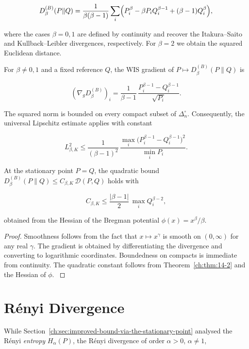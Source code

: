 \[
D_\beta^{(B)}(P\|Q)
=
\frac{1}{\beta(\beta-1)}
\sum_i
\Bigl(
P_i^\beta
-
\beta P_i Q_i^{\beta-1}
+
(\beta-1)Q_i^\beta
\Bigr),
\]

where the cases \(\beta=0,1\) are defined by continuity and recover the
Itakura--Saito and Kullback--Leibler divergences, respectively.  For
\(\beta=2\) we obtain the squared Euclidean distance.

\begin{theorem}
\label{ch:thm:beta-div}
For \(\beta\neq0,1\) and a fixed reference \(Q\), the WIS gradient of
\(P\mapsto D_\beta^{(B)}(P\|Q)\) is

\[
(\nabla_g D_\beta^{(B)})_i
=
\frac{1}{\beta-1}
\,
\frac{
P_i^{\beta-1} - Q_i^{\beta-1}
}{
\sqrt{P_i}
}.
\]

The squared norm is bounded on every compact subset of
\(\Delta_n^\circ\).  Consequently, the universal Lipschitz estimate
applies with constant

\[
L_{\beta,K}^2
\le
\frac{1}{(\beta-1)^2}
\,
\frac{
\max_i\bigl(P_i^{\beta-1}-Q_i^{\beta-1}\bigr)^2
}{
\min_i P_i
}.
\]

At the stationary point \(P=Q\), the quadratic bound
\(D_\beta^{(B)}(P\|Q)\le C_{\beta,K}\,\mathcal D(P,Q)\) holds with

\[
C_{\beta,K}
\le
\frac{|\beta-1|}{2}
\,
\max_i Q_i^{\beta-2},
\]

obtained from the Hessian of the Bregman potential \(\phi(x)=x^\beta/\beta\).
\end{theorem}

\begin{proof}
Smoothness follows from the fact that \(x\mapsto x^\gamma\) is smooth on
\((0,\infty)\) for any real \(\gamma\).  The gradient is obtained by
differentiating the divergence and converting to logarithmic
coordinates.  Boundedness on compacts is immediate from continuity.
The quadratic constant follows from Theorem~\ref{ch:thm:14-2} and the
Hessian of \(\phi\). \(\)
\end{proof}

\section{R\'enyi Divergence}\label{ch:sec:renyi-divergence}

While Section~\ref{ch:sec:improved-bound-via-the-stationary-point} analysed the R\'enyi \emph{entropy}
\(H_\alpha(P)\), the R\'enyi divergence of order \(\alpha>0\),
\(\alpha\neq1\),

